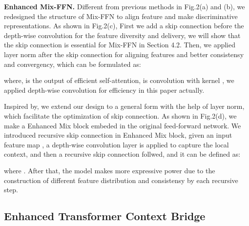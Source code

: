 \documentclass[letterpaper]{article} \usepackage{aaai22}  \usepackage{times}  \usepackage{helvet}  \usepackage{courier}  \usepackage[hyphens]{url}  \usepackage{graphicx} \urlstyle{rm} \def\UrlFont{\rm}  \usepackage{natbib}  \usepackage{caption} \DeclareCaptionStyle{ruled}{labelfont=normalfont,labelsep=colon,strut=off} \frenchspacing  \setlength{\pdfpagewidth}{8.5in}  \setlength{\pdfpageheight}{11in}  \usepackage{algorithm}
\begin{document}
\textbf{Enhanced Mix-FFN.} Different from previous methods in Fig.2(a) and (b), we redesigned the structure of Mix-FFN to align feature and make discriminative representations. As shown in Fig.2(c), First we add a skip connection before the depth-wise convolution for the feature diversity and delivery, we will show that the skip connection is essential for Mix-FFN in Section 4.2. Then, we applied layer norm after the skip connection for aligning features and better consistensy and convergency, which can be formulated as:

where,  is the output of efficient self-attention,  is convolution with kernel , we applied depth-wise convolution for efficiency in this paper actually. 

Inspired by\cite{liu2020rethinking}, we extend our design to a general form with the help of layer norm, which facilitate the optimization of skip connection\cite{vaswani2017attention}. As shown in Fig.2(d), we make a Enhanced Mix block embeded in the original feed-forward network. We introduced recursive skip connection in Enhanced Mix block, given an input feature map , a depth-wise convolution layer is applied to capture the local context, and then a recursive skip connection follwed, and it can be defined as:

where .
After that, the model makes more expressive power due to the construction of different feature distribution and consistensy by each recursive step.

\subsection{Enhanced Transformer Context Bridge}
\end{document}
